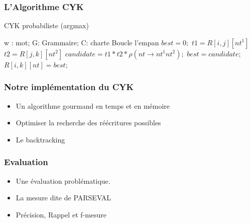 \documentclass[table]{beamer}
\begin{document}
\begin{frame}
 \frametitle{L'Algorithme CYK}
	\begin{algorithm}[H]
	\caption{CYK probabiliste (argmax)}
		\small{\begin{algorithmic}
			 \Comment w : mot; G: Grammaire; C: charte
				 \Comment Boucle  l'empan
						 
							\State $best = 0;$
									\State $t1 = R[i,j][nt^1]$ 
									\State $t2 = R[j,k][nt^2]$
									\State $candidate = t1 * t2 * \rho(nt \rightarrow nt^1 nt^2  );$
										\State $best = candidate;$
									\EndIf
								\EndFor
							\EndFor
							\State $R[i,k][nt] = best;$
						\EndFor
					\EndFor
				\EndFor
			\EndFunction
		\end{algorithmic} }
	\end{algorithm}

\end{frame}


\begin{frame}
\frametitle{Notre implémentation du CYK}

\begin{itemize}
 \item<1-3>{Un algorithme gourmand en temps et en mémoire}
 \item<2-3>{Optimiser la recherche des réécritures possibles}
 \item<3>{Le backtracking}
\end{itemize}


 
\end{frame}

\begin{frame}
\frametitle{Evaluation}
\begin{itemize}
 \item<1-3> {Une évaluation problématique.}
 \item<2-3> {La mesure dite de PARSEVAL}
 \item<3> {Précision, Rappel et f-mesure}
\end{itemize}

\end{frame}
\end{document}
